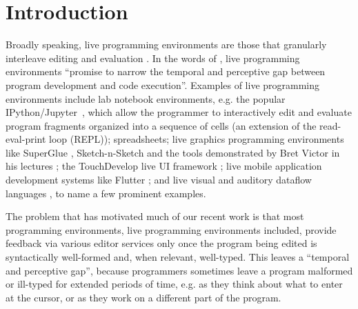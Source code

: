 \newcommand{\introSec}{Introduction}
\section{\protect\introSec} %
\label{sec:intro}

Broadly speaking, live programming environments are those that granularly interleave editing and evaluation \cite{DBLP:conf/icse/Tanimoto13,DBLP:journals/vlc/Tanimoto90,McDirmid:2007:LUL:1297027.1297073,burckhardt2013s}. 
In the words of \citet{burckhardt2013s}, live programming environments 
``promise to narrow the temporal and perceptive gap 
between program development and code execution''. Examples of live programming environments include {lab notebook environments},
e.g. the popular IPython/Jupyter~\cite{PER-GRA:2007}, which allow the
programmer to interactively edit and evaluate program fragments organized into a
sequence of cells (an extension of the read-eval-print loop (REPL)); spreadsheets; {live graphics programming environments} like SuperGlue \cite{McDirmid:2007:LUL:1297027.1297073}, Sketch-n-Sketch \cite{DBLP:conf/pldi/ChughHSA16} and the tools demonstrated by Bret Victor in his lectures \cite{victor2012inventing}; the TouchDevelop live UI framework \cite{burckhardt2013s}; live mobile application development systems like Flutter \cite{flutter}; and live visual and auditory dataflow languages \cite{DBLP:conf/vl/BurnettAW98}, to name a few prominent examples.


The problem that has motivated much of our recent work is that most  
programming environments, live programming environments included,  provide feedback via various editor services only once the program being edited is syntactically well-formed and, when relevant, well-typed. This leaves a ``temporal and perceptive gap'', because programmers sometimes leave a program malformed or ill-typed for extended periods of time, e.g. as they think about what to enter at the cursor, or as they work on a different part of the program.

